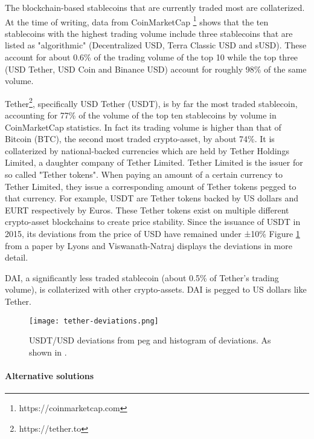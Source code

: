 The blockchain-based stablecoins that are currently traded most are
collaterized. At the time of writing, data from CoinMarketCap
\footnote{https://coinmarketcap.com} shows that the ten stablecoins
with the highest trading volume include three stablecoins that are
listed as "algorithmic" (Decentralized USD, Terra Classic USD and
sUSD). These account for about 0.6\% of the trading volume of the top
10 while the top three (USD Tether, USD Coin and Binance USD) account
for roughly 98\% of the same volume.

Tether\footnote{https://tether.to}, specifically USD Tether (USDT),
is by far the most traded stablecoin, accounting for 77\% of the
volume of the top ten stablecoins by volume in CoinMarketCap
statistics. In fact its trading volume is higher than that of Bitcoin
(BTC), the second most traded crypto-asset, by about 74\%. It is
collaterized by national-backed currencies which are held by Tether
Holdings Limited, a daughter company of Tether Limited. Tether Limited
is the issuer for so called "Tether tokens". When paying an amount of
a certain currency to Tether Limited, they issue a corresponding
amount of Tether tokens pegged to that currency. For example, USDT are
Tether tokens backed by US dollars and EURT respectively by
Euros. These Tether tokens exist on multiple different crypto-asset
blockchains to create price stability. Since the issuance of USDT in
2015, its deviations from the price of USD have remained under ±10\%
Figure \ref{fig:tether-deviations} from a paper by Lyons and
Viswanath-Natraj \cite{lyonsStable} displays the deviations in more
detail.

DAI, a significantly less traded stablecoin (about 0.5\% of Tether's
trading volume), is collaterized with other crypto-assets. DAI is
pegged to US dollars like Tether.




\begin{figure}
  \texttt{[image: tether-deviations.png]}
  \caption{USDT/USD deviations from peg and histogram of deviations.
  As shown in \cite{lyonsStable}.}
  \label{fig:tether-deviations}
\end{figure}

\paragraph{Alternative solutions}

